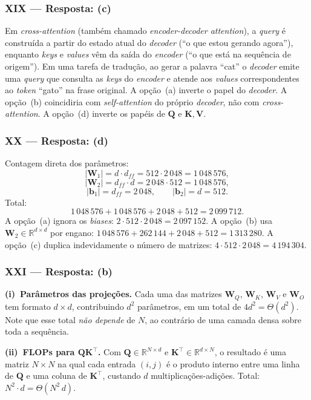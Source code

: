 \documentclass{dlproblemset}
\begin{document}
\subsubsection*{XIX — Resposta: (c)}
Em \textit{cross-attention} (também chamado \textit{encoder-decoder
attention}), a \textit{query} é construída a partir do estado atual do
\textit{decoder} (``o que estou gerando agora''), enquanto \textit{keys}
e \textit{values} vêm da saída do \textit{encoder} (``o que está na
sequência de origem''). Em uma tarefa de tradução, ao gerar a palavra
``cat'' o \textit{decoder} emite uma \textit{query} que consulta as
\textit{keys} do \textit{encoder} e atende aos \textit{values}
correspondentes ao \textit{token} ``gato'' na frase original.
A opção~(a) inverte o papel do \textit{decoder}. A opção~(b) coincidiria
com \textit{self-attention} do próprio \textit{decoder}, não com
\textit{cross-attention}. A opção~(d) inverte os papéis de $\mathbf{Q}$ e $\mathbf{K}, \mathbf{V}$.

\subsubsection*{XX — Resposta: (d)}
Contagem direta dos parâmetros:
\[
  |\mathbf{W}_1| = d \cdot d_{ff} = 512 \cdot 2\,048 = 1\,048\,576,
\]
\[
  |\mathbf{W}_2| = d_{ff} \cdot d = 2\,048 \cdot 512 = 1\,048\,576,
\]
\[
  |\mathbf{b}_1| = d_{ff} = 2\,048, \qquad |\mathbf{b}_2| = d = 512.
\]
Total:
\[
  1\,048\,576 + 1\,048\,576 + 2\,048 + 512 = 2\,099\,712.
\]
A opção~(a) ignora os \textit{biases}: $2\cdot 512\cdot 2\,048 = 2\,097\,152$.
A opção~(b) usa $\mathbf{W}_2 \in \mathbb{R}^{d\times d}$ por engano:
$1\,048\,576 + 262\,144 + 2\,048 + 512 = 1\,313\,280$.
A opção~(c) duplica indevidamente o número de matrizes:
$4\cdot 512\cdot 2\,048 = 4\,194\,304$.

\subsubsection*{XXI — Resposta: (b)}
\textbf{(i)~Parâmetros das projeções.} Cada uma das matrizes $\mathbf{W}_Q$, $\mathbf{W}_K$,
$\mathbf{W}_V$ e $\mathbf{W}_O$ tem formato $d \times d$, contribuindo $d^2$ parâmetros, em
um total de $4d^2 = \Theta(d^2)$. Note que esse total \emph{não depende}
de $N$, ao contrário de uma camada densa sobre toda a sequência.

\textbf{(ii)~FLOPs para $\mathbf{Q} \mathbf{K}^\top$.} Com $\mathbf{Q} \in \mathbb{R}^{N\times d}$ e
$\mathbf{K}^\top \in \mathbb{R}^{d\times N}$, o resultado é uma matriz $N\times N$ na
qual cada entrada $(i, j)$ é o produto interno entre uma linha de $\mathbf{Q}$ e
uma coluna de $\mathbf{K}^\top$, custando $d$ multiplicações-adições. Total:
$N^2 \cdot d = \Theta(N^2\, d)$.
\end{document}
